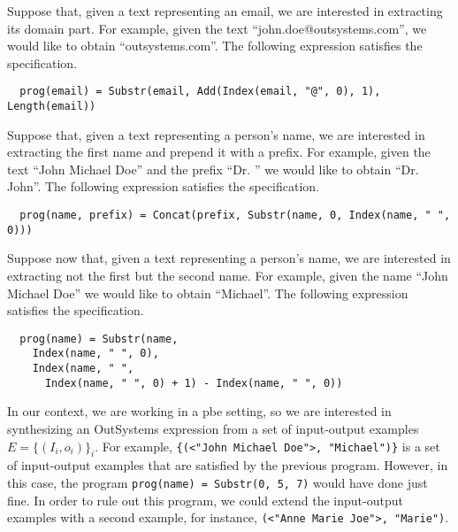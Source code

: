 \begin{example}
  Suppose that, given a text representing an email, we are interested in
  extracting its domain part.
  For example, given the text ``john.doe@outsystems.com'', we would like to
  obtain ``outsystems.com''.
  The following expression satisfies the specification.

\begin{lstlisting}
  prog(email) = Substr(email, Add(Index(email, "@", 0), 1), Length(email))
\end{lstlisting}
\end{example}

\begin{example}\label{ex:first-name}
  Suppose that, given a text representing a person's name, we are interested in
extracting the first name and prepend it with a prefix. For example, given the
text ``John Michael Doe'' and the prefix ``Dr. '' we would like to obtain
``Dr. John''. The following expression satisfies the specification.
 
\begin{lstlisting}
  prog(name, prefix) = Concat(prefix, Substr(name, 0, Index(name, " ", 0)))
\end{lstlisting}
\end{example}

\begin{example}\label{ex:second-name}
  Suppose now that, given a text representing a person's name, we are interested
in extracting not the first but the second name. For example, given the name
``John Michael Doe'' we would like to obtain ``Michael''. The following
expression satisfies the specification.
 
\begin{lstlisting}
  prog(name) = Substr(name,
    Index(name, " ", 0),
    Index(name, " ",
      Index(name, " ", 0) + 1) - Index(name, " ", 0))
\end{lstlisting}
\end{example}

In our context, we are working in a \gls{pbe} setting, so we are interested in
synthesizing an OutSystems expression from a set of input-output examples
$E = \{(I_i, o_i)\}_i$. For example,
\lstinline|{(<"John Michael Doe">, "Michael")}|
is a set of input-output examples that are satisfied by the previous program.
However, in this case, the program
\lstinline|prog(name) = Substr(0, 5, 7)|
would have done just fine. In order to rule out this program, we could extend
the input-output examples with a second example, for instance,
\lstinline|(<"Anne Marie Joe">, "Marie")|.

